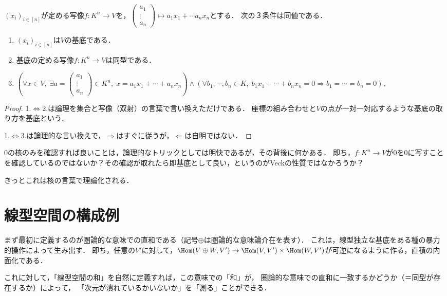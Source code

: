 \documentclass[uplatex, dvipdfmx]{jsreport}
\begin{document}
\begin{proposition}[基底の特徴付け２]\label{prop-categorical-basis-old}
    $(x_i)_{i\in[n]}$が定める写像$f:K^n\to V$を，$\begin{pmatrix}a_1\\\vdots\\a_n\end{pmatrix}\mapsto a_1x_1+\cdots a_nx_n$とする．
    次の３条件は同値である．
    \begin{enumerate}
        \item $(x_i)_{i\in[n]}$は$V$の基底である．
        \item 基底の定める写像$f:K^n\to V$は同型である．
        \item $(\forall x\in V,\; \exists a=\begin{pmatrix}a_1\\\vdots\\a_n\end{pmatrix}\in K^n,\; x=a_1x_1+\cdots+a_nx_n)\land(\forall b_1,\cdots,b_n\in K,\; b_1x_1+\cdots+b_nx_n=0\Rightarrow b_1=\cdots=b_n=0)$．
    \end{enumerate}
\end{proposition}
\begin{proof}
    1.$\Leftrightarrow$2.は論理を集合と写像（双射）の言葉で言い換えただけである．
    座標の組み合わせと$V$の点が一対一対応するような基底の取り方を基底という．

    1.$\Leftrightarrow$3.は論理的な言い換えで，$\Rightarrow$はすぐに従うが，$\Leftarrow$は自明ではない．
\end{proof}
\begin{remark}
    $0$の核のみを確認すれば良いことは，論理的なトリックとしては明快であるが，その背後に何かある．
    即ち，$f:K^n\to V$が$0$を$0$に写すことを確認しているのではないか？その確認が取れたら即基底として良い，というのがVeckの性質ではなかろうか？

    きっとこれは核の言葉で理論化される．
\end{remark}

\section{線型空間の構成例}

\begin{tcolorbox}[colframe=ForestGreen, colback=ForestGreen!10!white, breakable]
    まず最初に定義するのが圏論的な意味での直和である（記号$\oplus$は圏論的な意味論介在を表す）．
    これは，線型独立な基底をある種の暴力的操作によって生み出す．
    即ち，任意の$V'$に対して，$\Hom(V\oplus W,V')\to\Hom(V,V')\times\Hom(W,V')$が可逆になるように作る，直積の内面化である．

    これに対して，「線型空間の和」を自然に定義すれば，この意味での「和」が，
    圏論的な意味での直和に一致するかどうか（＝同型が存在するか）によって，
    「次元が潰れているかいないか」を「測る」ことができる．
\end{tcolorbox}
\end{document}
